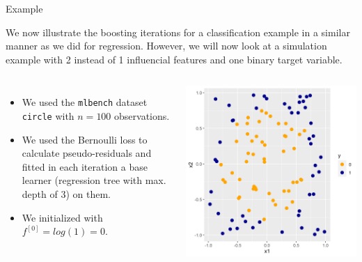 \begin{vbframe}{Example}

We now illustrate the boosting iterations for a classification example in a similar manner as we did for regression.
However, we will now look at a simulation example with 2 instead of 1 influencial features and one binary target variable.

\begin{columns}
\column{5.5cm}
\begin{itemize}
\item We used the \texttt{mlbench} dataset \texttt{circle} with $n = 100$ observations.
\item We used the Bernoulli loss to calculate pseudo-residuals and fitted in each iteration a base learner (regression tree with max. depth of 3) on them.
\item We initialized with $f^{[0]} = log(1) = 0.$
\end{itemize}
\column{4.5cm}
\begin{center}
\includegraphics[width=\textwidth]{figure/boosting_classif_example.png}
\end{center}

\end{columns}



\end{vbframe}

